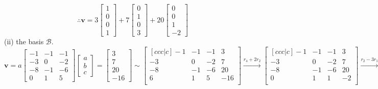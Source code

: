 \documentclass[12pt]{article}
\begin{document}
$$
\therefore \mathbf{v}=
3
\begin{bmatrix}
   1 \\
   0 \\
   0 \\
   1
\end{bmatrix}
+7
\begin{bmatrix}
   0 \\
   1 \\
   0 \\
   3
\end{bmatrix}
+20
\begin{bmatrix}
   0 \\
   0 \\
   1 \\
   -2
\end{bmatrix}
$$
\hspace{40pt}
(ii) the basis $\mathcal{B}$.\\
$$
\mathbf{v}=
a
\begin{bmatrix}
   -1 & -1 & -1 \\
   -3 & 0 & -2 \\
   -8 & -1 & -6 \\
   0 & 1 & 5
\end{bmatrix}
\begin{bmatrix}
	a \\
	b \\
	c
\end{bmatrix}
=
\begin{bmatrix}
   3 \\
   7 \\
   20 \\
   -16
\end{bmatrix}
\sim
\begin{bmatrix}[ccc|c]
   -1 & -1 & -1 & 3 \\
   -3 & 0 & -2 & 7 \\
   -8 & -1 & -6 & 20 \\
   6 & 1 & 5 & -16 \\
\end{bmatrix} \overset{r_4+2r_2}{\longrightarrow} 
\begin{bmatrix}[ccc|c]
   -1 & -1 & -1 & 3 \\
   -3 & 0 & -2 & 7 \\
   -8 & -1 & -6 & 20 \\
   0 & 1 & 1 & -2 \\
\end{bmatrix} \overset{r_2-3r_1}{\longrightarrow}
$$
\end{document}

